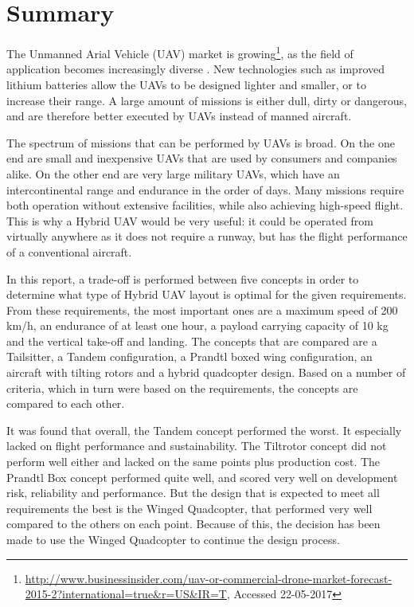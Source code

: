 \chapter*{Summary} 


The Unmanned Arial Vehicle (UAV) market is growing\footnote{\url{http://www.businessinsider.com/uav-or-commercial-drone-market-forecast-2015-2?international=true&r=US&IR=T}, Accessed 22-05-2017}, as the field of application becomes increasingly diverse \cite{baseline}. New technologies such as improved lithium batteries allow the UAVs to be designed lighter and smaller, or to increase their range. A large amount of missions is either dull, dirty or dangerous, and are therefore better executed by UAVs instead of manned aircraft. 


The spectrum of missions that can be performed by UAVs is broad. On the one end are small and inexpensive UAVs that are used by consumers and companies alike. On the other end are very large military UAVs, which have an intercontinental range and endurance in the order of days. Many missions require both operation without extensive facilities, while also achieving high-speed flight. This is why a Hybrid UAV would be very useful: it could be operated from virtually anywhere as it does not require a runway, but has the flight performance of a conventional aircraft.

In this report, a trade-off is performed between five concepts in order to determine what type of Hybrid UAV layout is optimal for the given requirements. From these requirements, the most important ones are a maximum speed of 200 km/h, an endurance of at least one hour, a payload carrying capacity of 10 kg and the vertical take-off and landing. The concepts that are compared are a Tailsitter, a Tandem configuration, a Prandtl boxed wing configuration, an aircraft with tilting rotors and a hybrid quadcopter design. Based on a number of criteria, which in turn were based on the requirements, the concepts are compared to each other. 


It was found that overall, the Tandem concept performed the worst. It especially lacked on flight performance and sustainability. The Tiltrotor concept did not perform well either and lacked on the same points plus production cost. The Prandtl Box concept performed quite well, and scored very well on development risk, reliability and performance. But the design that is expected to meet all requirements the best is the Winged Quadcopter, that performed very well compared to the others on each point. Because of this, the decision has been made to use the Winged Quadcopter to continue the design process.













